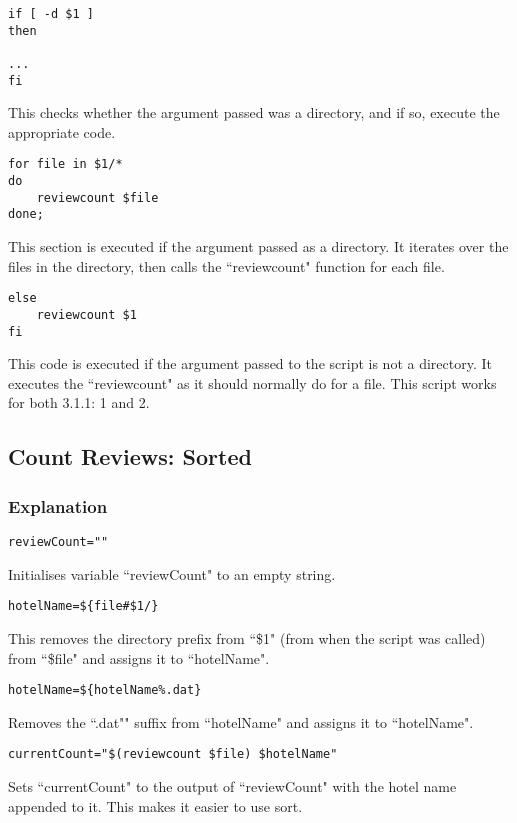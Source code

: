 \documentclass[a4paper]{article}
\begin{document}
\begin{lstlisting}
if [ -d $1 ]
then

...
fi
\end{lstlisting}
This checks whether the argument passed was a directory, and if so, execute the appropriate code.

\begin{lstlisting}
for file in $1/*
do
	reviewcount $file
done;
\end{lstlisting}
This section is executed if the argument passed as a directory.
It iterates over the files in the directory, then calls the ``reviewcount" function for each file.

\begin{lstlisting}
else
	reviewcount $1
fi
\end{lstlisting}
This code is executed if the argument passed to the script is not a directory.
It executes the ``reviewcount" as it should normally do for a file. \newline \newline
This script works for both 3.1.1: 1 and 2.

%
\newpage
\subsection{Count Reviews: Sorted}


\subsubsection{Explanation}
\begin{lstlisting}
reviewCount=""
\end{lstlisting}
Initialises variable ``reviewCount" to an empty string.

\begin{lstlisting}
hotelName=${file#$1/}
\end{lstlisting}
This removes the directory prefix from ``\$1" (from when the script was called) from ``\$file" and assigns it to ``hotelName".

\begin{lstlisting}
hotelName=${hotelName%.dat}
\end{lstlisting}
Removes the ``.dat"" suffix from ``hotelName" and assigns it to ``hotelName".

\begin{lstlisting}
currentCount="$(reviewcount $file) $hotelName"
\end{lstlisting}
Sets ``currentCount" to the output of ``reviewCount" with the hotel name appended to it. This makes it easier to use sort.
\end{document}
